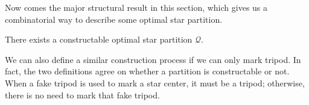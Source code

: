\documentclass{theoretics}
\begin{document}
Now comes the major structural result in this section, which gives us a combinatorial way to describe some optimal star partition. 

\begin{theorem}
    \label{thm:constructability}
    There exists a constructable optimal star partition $\mathcal{Q}$. 
\end{theorem}

\begin{remark}
    We can also define a similar construction process if we can only mark tripod. 
    In fact, the two definitions agree on whether a partition is constructable or not. 
    When a fake tripod is used to mark a star center, it must be a tripod; otherwise, there is no need to mark that fake tripod. 
\end{remark}
\end{document}
